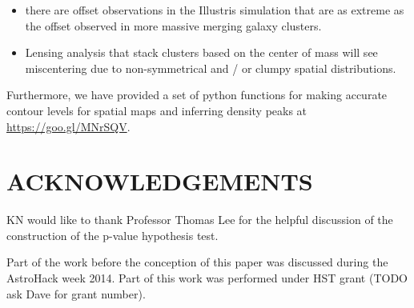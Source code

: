 \begin{itemize}
		\item there are offset observations in the Illustris simulation that are as
			extreme as the offset observed in more massive merging galaxy clusters. 
			
		\item Lensing analysis that stack clusters based on the center of mass 
			will see miscentering due to 
			non-symmetrical and / or clumpy spatial distributions. 




\end{itemize}

Furthermore, we have provided a set of python functions for making accurate 
contour levels for spatial maps and inferring density peaks at 
\href{https://goo.gl/MNrSQV}{https://goo.gl/MNrSQV}.
% 
% 
% 
% 
% 
% 
% 


\section{ACKNOWLEDGEMENTS}
KN would like to thank Professor Thomas Lee for the helpful discussion of 
the construction of the p-value hypothesis test. 

Part of the work before the conception of this paper was discussed during 
the AstroHack week 2014. 
Part of this work was performed under HST grant (TODO ask Dave for grant
number). 
% 
% 
% 
% 
% 
% 
% 

